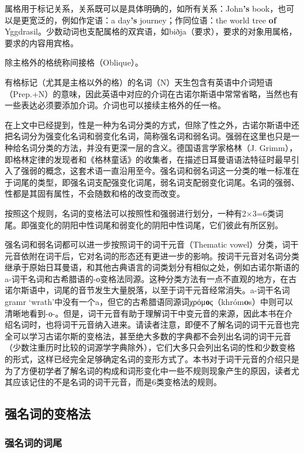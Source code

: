 属格用于标记关系，关系既可以是具体明确的，如所有关系：John\textbf{'s}
book，也可以是更宽泛的，例如作定语：a day\textbf{‌'s}
journey；作同位语：the world tree \textbf{of}
Yggdrasil。少数动词也支配属格的双宾语，如biðja（要求），要求的对象用属格，要求的内容用宾格。

除主格外的格统称间接格（Oblique）。

有格标记（尤其是主格以外的格）的名词（N）天生包含有英语中介词短语（Prep.+N）的意味，因此英语中对应的介词在古诺尔斯语中常常省略，当然也有一些表达必须要添加介词。介词也可以接续主格外的任一格。

在上文中已经提到，性是一种为名词分类的方式，但除了性之外，古诺尔斯语中还把名词分为强变化名词和弱变化名词，简称强名词和弱名词。强弱在这里也只是一种给名词分类的方法，并没有更深一层的含义。德国语言学家格林（J.
Grimm），即格林定律的发现者和《格林童话》的收集者，在描述日耳曼语语法特征时最早引入了强弱的概念，这套术语一直沿用至今。强名词和弱名词这一分类的唯一标准在于词尾的类型，即强名词支配强变化词尾，弱名词支配弱变化词尾。名词的强弱、性都是其固有属性，不会随数和格的改变而改变。

按照这个规则，名词的变格法可以按照性和强弱进行划分，一种有2×3=6类词尾。即强变化的阴阳中性词尾和弱变化的阴阳中性词尾，它们彼此有所区别。

强名词和弱名词都可以进一步按照词干的词干元音（Thematic
vowel）分类，词干元音依附在词干后，它对名词的形态还有更进一步的影响。按词干元音对名词分类继承于原始日耳曼语，和其他古典语言的词类划分有相似之处，例如古诺尔斯语的a-词干名词和古希腊语的-ο变格法同源。这种分类方法有一点不直观的地方，在古诺尔斯语中，词尾的音节发生大量脱落，以至于词干元音经常消失。a-词干名词gramr
`wrath'中没有一个a，但它的古希腊语同源词χρόμ\textbf{ο}ς（khróm\textbf{o}s）中则可以清晰地看到-ο-。但是，词干元音有助于理解词干中变元音的来源，因此本书在介绍名词时，也将词干元音纳入进来。请读者注意，即便不了解名词的词干元音也完全可以学习古诺尔斯的变格法，甚至绝大多数的字典都不会列出名词的词干元音（少数注重历时比较的词源学字典除外），它们大多只会列出名词的性和少数变格的形式，这样已经完全足够确定名词的变形方式了。本书对于词干元音的介绍只是为了方便初学者了解名词的构成和词形变化中一些不规则现象产生的原因，读者尤其应该记住的不是名词的词干元音，而是6类变格法的规则。

\subsection{强名词的变格法}\label{ux5f3aux540dux8bcdux7684ux53d8ux683cux6cd5}

\subsubsection{强名词的词尾}\label{ux5f3aux540dux8bcdux7684ux8bcdux5c3e}

